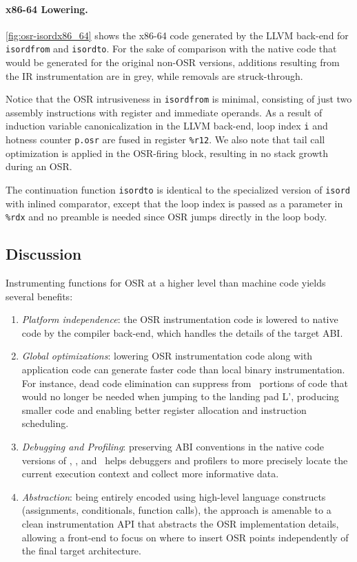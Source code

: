 \paragraph*{x86-64 Lowering.}

\myfigure\ref{fig:osr-isordx86_64} shows the x86-64 code generated by the LLVM back-end for {\tt isordfrom} and {\tt isordto}. For the sake of comparison with the native code that would be generated for the original non-OSR versions, additions resulting from the IR instrumentation are in grey, while removals are struck-through.

Notice that the OSR intrusiveness in {\tt isordfrom} is minimal, consisting of just two assembly instructions with register and immediate operands. As a result of induction variable canonicalization in the LLVM back-end, loop index {\tt i} and hotness counter {\tt p.osr} are fused in register {\tt\%r12}. We also note that tail call optimization is applied in the OSR-firing block, resulting in no stack growth during an OSR.

\noindent The continuation function {\tt isordto} is identical to the specialized version of {\tt isord} with inlined comparator, except that the loop index is passed as a parameter in {\tt \%rdx} and no %
preamble is needed since OSR jumps directly in the loop body.

\subsection{Discussion}
Instrumenting functions for OSR at a higher level than machine code yields several benefits: 
\begin{enumerate}[parsep=0pt]
\item {\em Platform independence}: the OSR instrumentation code is lowered to native code by the compiler back-end, which handles the details of the target ABI. 
\item {\em Global optimizations}: lowering OSR instrumentation code along with application code can generate faster code than local binary instrumentation. For instance, dead code elimination can suppress from \fosrto\ portions of code that would no longer be needed when jumping to the landing pad \textsf{L'}, producing smaller code and enabling better register allocation and instruction scheduling.
\item {\em Debugging and Profiling}: preserving ABI conventions in the native code versions of \fosrfrom, \fstub, and \fosrto\ helps debuggers and profilers to more precisely locate the current execution context and collect more informative data.
\item {\em Abstraction}: being entirely encoded using high-level language constructs (assignments, conditionals, function calls), the approach is amenable to a clean instrumentation API that abstracts the OSR implementation details, allowing a front-end to focus on where to insert OSR points independently of the final target architecture.
\end{enumerate}

